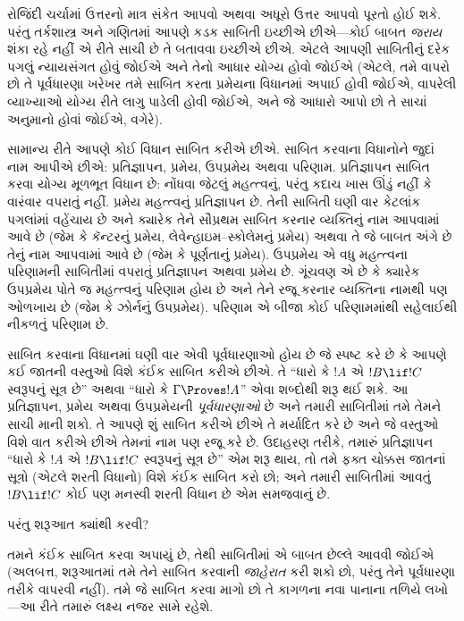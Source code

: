 રોજિંદી ચર્ચામાં ઉત્તરનો માત્ર સંકેત આપવો અથવા અધૂરો ઉત્તર આપવો
પૂરતો હોઈ શકે. પરંતુ તર્કશાસ્ત્ર અને ગણિતમાં આપણે કડક સાબિતી
ઇચ્છીએ છીએ---કોઈ બાબત \emph{જરાય} શંકા રહે નહીં એ રીતે સાચી છે તે
બતાવવા ઇચ્છીએ છીએ. એટલે આપણી સાબિતીનું દરેક પગલું ન્યાયસંગત હોવું
જોઈએ અને તેનો આધાર યોગ્ય હોવો જોઈએ (એટલે, તમે વાપરો છો તે
પૂર્વધારણા ખરેખર તમે સાબિત કરતા પ્રમેયના વિધાનમાં અપાઈ હોવી જોઈએ,
વાપરેલી વ્યાખ્યાઓ યોગ્ય રીતે લાગુ પાડેલી હોવી જોઈએ, અને જે
આધારો આપો છો તે સાચાં અનુમાનો હોવાં જોઈએ, વગેરે).

સામાન્ય રીતે આપણે કોઈ વિધાન સાબિત કરીએ છીએ. સાબિત કરવાના
વિધાનોને જુદાં નામ આપીએ છીએ: પ્રતિજ્ઞાપન, પ્રમેય, ઉપપ્રમેય અથવા
પરિણામ. પ્રતિજ્ઞાપન સાબિત કરવા યોગ્ય મૂળભૂત વિધાન છે: નોંધવા જેટલું
મહત્ત્વનું, પરંતુ કદાચ ખાસ ઊંડું નહીં કે વારંવાર વપરાતું નહીં.
પ્રમેય મહત્ત્વનું પ્રતિજ્ઞાપન છે. તેની સાબિતી ઘણી વાર કેટલાંક
પગલાંમાં વહેંચાય છે અને ક્યારેક તેને સૌપ્રથમ સાબિત કરનાર વ્યક્તિનું
નામ આપવામાં આવે છે (જેમ કે કૅન્ટરનું પ્રમેય, લેવેન્હાઇમ--સ્કોલેમનું
પ્રમેય) અથવા તે જે બાબત અંગે છે તેનું નામ આપવામાં આવે છે (જેમ કે
પૂર્ણતાનું પ્રમેય). ઉપપ્રમેય એ વધુ મહત્ત્વના પરિણામની સાબિતીમાં
વપરાતું પ્રતિજ્ઞાપન અથવા પ્રમેય છે. ગૂંચવણ એ છે કે ક્યારેક ઉપપ્રમેય
પોતે જ મહત્ત્વનું પરિણામ હોય છે અને તેને રજૂ કરનાર વ્યક્તિના નામથી
પણ ઓળખાય છે (જેમ કે ઝોર્નનું ઉપપ્રમેય). પરિણામ એ બીજા કોઈ પરિણામમાંથી
સહેલાઈથી નીકળતું પરિણામ છે.

સાબિત કરવાના વિધાનમાં ઘણી વાર એવી પૂર્વધારણાઓ હોય છે જે સ્પષ્ટ કરે
છે કે આપણે કઈ જાતની વસ્તુઓ વિશે કંઈક સાબિત કરીએ છીએ. તે ``ધારો કે
$!A$ એ $!B \lif !C$ સ્વરૂપનું સૂત્ર છે'' અથવા ``ધારો કે
$\Gamma \Proves !A$'' એવા શબ્દોથી શરૂ થઈ શકે. આ પ્રતિજ્ઞાપન,
પ્રમેય અથવા ઉપપ્રમેયની \emph{પૂર્વધારણાઓ} છે અને તમારી સાબિતીમાં તમે
તેમને સાચી માની શકો. તે આપણે શું સાબિત કરીએ છીએ તે મર્યાદિત કરે
છે અને જે વસ્તુઓ વિશે વાત કરીએ છીએ તેમનાં નામ પણ રજૂ કરે છે.
ઉદાહરણ તરીકે, તમારું પ્રતિજ્ઞાપન ``ધારો કે $!A$ એ $!B \lif !C$
સ્વરૂપનું સૂત્ર છે'' એમ શરૂ થાય, તો તમે ફક્ત ચોક્કસ જાતનાં
સૂત્રો (એટલે શરતી વિધાનો) વિશે કંઈક સાબિત કરો છો; અને તમારી
સાબિતીમાં આવતું $!B \lif !C$ કોઈ પણ મનસ્વી શરતી વિધાન છે એમ
સમજવાનું છે.
\endgroup


\begingroup
\makeatletter{}\makeatother


\label{guunit:OLP-0604}


પરંતુ શરૂઆત ક્યાંથી કરવી?

તમને કંઈક સાબિત કરવા અપાયું છે, તેથી સાબિતીમાં એ બાબત છેલ્લે
આવવી જોઈએ (અલબત્ત, શરૂઆતમાં તમે તેને સાબિત કરવાની \emph{જાહેરાત}
કરી શકો છો, પરંતુ તેને પૂર્વધારણા તરીકે વાપરવી નહીં). તમે જે
સાબિત કરવા માગો છો તે કાગળના નવા પાનાના તળિયે લખો---આ રીતે
તમારું લક્ષ્ય નજર સામે રહેશે.

